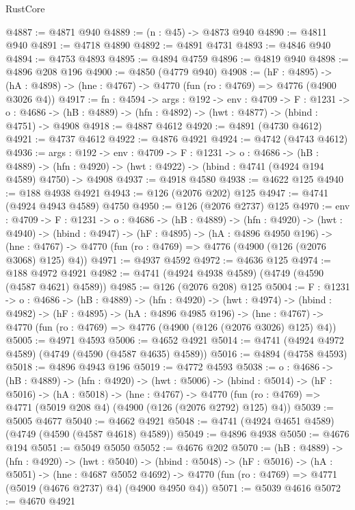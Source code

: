 \begin{lexlean}{RustCore}
\begin{coremodule}
@4887 := @4871 @940
@4889 := (n : @45) -> @4873 @940
@4890 := @4811 @940
@4891 := @4718 @4890
@4892 := @4891 @4731
@4893 := @4846 @940
@4894 := @4753 @4893
@4895 := @4894 @4759
@4896 := @4819 @940
@4898 := @4896 @208 @196
@4900 := @4850 (@4779 @940)
@4908 := (hF : @4895) ->
  (hA : @4898) -> (hne : @4767) -> @4770 (fun (ro : @4769) => @4776 (@4900 @3026 @4))
@4917 := {fn : @4594} ->
  {args : @192} ->
  {env : @4709} ->
  {F : @1231} ->
  {o : @4686} -> (hB : @4889) -> (hfn : @4892) -> (hwt : @4877) -> (hbind : @4751) -> @4908
@4918 := @4887 @4612
@4920 := @4891 (@4730 @4612)
@4921 := @4737 @4612
@4922 := @4876 @4921
@4924 := @4742 (@4743 @4612)
@4936 := {args : @192} ->
  {env : @4709} ->
  {F : @1231} ->
  {o : @4686} ->
  (hB : @4889) ->
  (hfn : @4920) -> (hwt : @4922) -> (hbind : @4741 (@4924 @194 @4589) @4750) -> @4908
@4937 := @4918 @4580
@4938 := @4622 @125
@4940 := @188 @4938 @4921
@4943 := @126 (@2076 @202) @125
@4947 := @4741 (@4924 @4943 @4589) @4750
@4950 := @126 (@2076 @2737) @125
@4970 := {env : @4709} ->
  {F : @1231} ->
  {o : @4686} ->
  (hB : @4889) ->
  (hfn : @4920) ->
  (hwt : @4940) ->
  (hbind : @4947) ->
  (hF : @4895) ->
  (hA : @4896 @4950 @196) ->
  (hne : @4767) -> @4770 (fun (ro : @4769) => @4776 (@4900 (@126 (@2076 @3068) @125) @4))
@4971 := @4937 @4592
@4972 := @4636 @125
@4974 := @188 @4972 @4921
@4982 := @4741 (@4924 @4938 @4589) (@4749 (@4590 (@4587 @4621) @4589))
@4985 := @126 (@2076 @208) @125
@5004 := {F : @1231} ->
  {o : @4686} ->
  (hB : @4889) ->
  (hfn : @4920) ->
  (hwt : @4974) ->
  (hbind : @4982) ->
  (hF : @4895) ->
  (hA : @4896 @4985 @196) ->
  (hne : @4767) -> @4770 (fun (ro : @4769) => @4776 (@4900 (@126 (@2076 @3026) @125) @4))
@5005 := @4971 @4593
@5006 := @4652 @4921
@5014 := @4741 (@4924 @4972 @4589) (@4749 (@4590 (@4587 @4635) @4589))
@5016 := @4894 (@4758 @4593)
@5018 := @4896 @4943 @196
@5019 := @4772 @4593
@5038 := {o : @4686} ->
  (hB : @4889) ->
  (hfn : @4920) ->
  (hwt : @5006) ->
  (hbind : @5014) ->
  (hF : @5016) ->
  (hA : @5018) ->
  (hne : @4767) ->
  @4770 (fun (ro : @4769) => @4771 (@5019 @208 @4) (@4900 (@126 (@2076 @2792) @125) @4))
@5039 := @5005 @4677
@5040 := @4662 @4921
@5048 := @4741 (@4924 @4651 @4589) (@4749 (@4590 (@4587 @4618) @4589))
@5049 := @4896 @4938
@5050 := @4676 @194
@5051 := @5049 @5050
@5052 := @4676 @202
@5070 := (hB : @4889) ->
  (hfn : @4920) ->
  (hwt : @5040) ->
  (hbind : @5048) ->
  (hF : @5016) ->
  (hA : @5051) ->
  (hne : @4687 @5052 @4692) ->
  @4770 (fun (ro : @4769) => @4771 (@5019 (@4676 @2737) @4) (@4900 @4950 @4))
@5071 := @5039 @4616
@5072 := @4670 @4921

\end{coremodule}
\end{lexlean}

